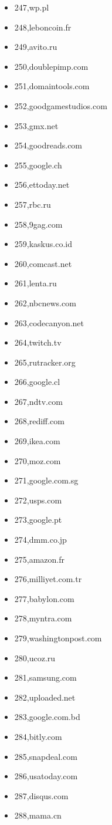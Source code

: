 \begin{multicols}{3}
\begin{itemize}
	\item 247,wp.pl
	\item 248,leboncoin.fr
	\item 249,avito.ru
	\item 250,doublepimp.com
	\item 251,domaintools.com
	\item 252,goodgamestudios.com
	\item 253,gmx.net
	\item 254,goodreads.com
	\item 255,google.ch
	\item 256,ettoday.net
	\item 257,rbc.ru
	\item 258,9gag.com
	\item 259,kaskus.co.id
	\item 260,comcast.net
	\item 261,lenta.ru
	\item 262,nbcnews.com
	\item 263,codecanyon.net
	\item 264,twitch.tv
	\item 265,rutracker.org
	\item 266,google.cl
	\item 267,ndtv.com
	\item 268,rediff.com
	\item 269,ikea.com
	\item 270,moz.com
	\item 271,google.com.sg
	\item 272,usps.com
	\item 273,google.pt
	\item 274,dmm.co.jp
	\item 275,amazon.fr
	\item 276,milliyet.com.tr
	\item 277,babylon.com
	\item 278,myntra.com
	\item 279,washingtonpost.com
	\item 280,ucoz.ru
	\item 281,samsung.com
	\item 282,uploaded.net
	\item 283,google.com.bd
	\item 284,bitly.com
	\item 285,snapdeal.com
	\item 286,usatoday.com
	\item 287,disqus.com
	\item 288,mama.cn

\end{itemize}
\end{multicols}
